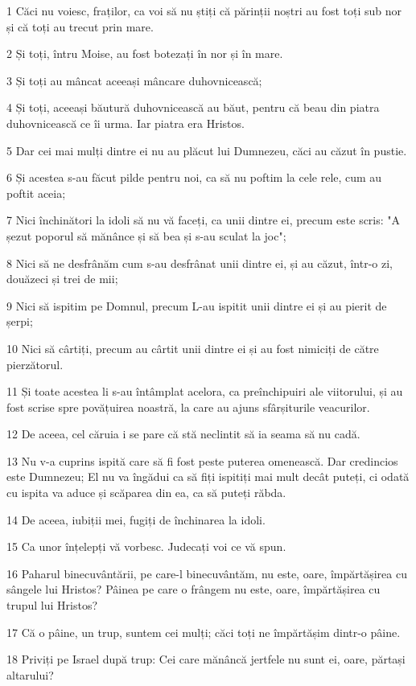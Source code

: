 \par 1 Căci nu voiesc, fraților, ca voi să nu știți că părinții noștri au fost toți sub nor și că toți au trecut prin mare.
\par 2 Și toți, întru Moise, au fost botezați în nor și în mare.
\par 3 Și toți au mâncat aceeași mâncare duhovnicească;
\par 4 Și toți, aceeași băutură duhovnicească au băut, pentru că beau din piatra duhovnicească ce îi urma. Iar piatra era Hristos.
\par 5 Dar cei mai mulți dintre ei nu au plăcut lui Dumnezeu, căci au căzut în pustie.
\par 6 Și acestea s-au făcut pilde pentru noi, ca să nu poftim la cele rele, cum au poftit aceia;
\par 7 Nici închinători la idoli să nu vă faceți, ca unii dintre ei, precum este scris: "A șezut poporul să mănânce și să bea și s-au sculat la joc";
\par 8 Nici să ne desfrânăm cum s-au desfrânat unii dintre ei, și au căzut, într-o zi, douăzeci și trei de mii;
\par 9 Nici să ispitim pe Domnul, precum L-au ispitit unii dintre ei și au pierit de șerpi;
\par 10 Nici să cârtiți, precum au cârtit unii dintre ei și au fost nimiciți de către pierzătorul.
\par 11 Și toate acestea li s-au întâmplat acelora, ca preînchipuiri ale viitorului, și au fost scrise spre povățuirea noastră, la care au ajuns sfârșiturile veacurilor.
\par 12 De aceea, cel căruia i se pare că stă neclintit să ia seama să nu cadă.
\par 13 Nu v-a cuprins ispită care să fi fost peste puterea omenească. Dar credincios este Dumnezeu; El nu va îngădui ca să fiți ispitiți mai mult decât puteți, ci odată cu ispita va aduce și scăparea din ea, ca să puteți răbda.
\par 14 De aceea, iubiții mei, fugiți de închinarea la idoli.
\par 15 Ca unor înțelepți vă vorbesc. Judecați voi ce vă spun.
\par 16 Paharul binecuvântării, pe care-l binecuvântăm, nu este, oare, împărtășirea cu sângele lui Hristos? Pâinea pe care o frângem nu este, oare, împărtășirea cu trupul lui Hristos?
\par 17 Că o pâine, un trup, suntem cei mulți; căci toți ne împărtășim dintr-o pâine.
\par 18 Priviți pe Israel după trup: Cei care mănâncă jertfele nu sunt ei, oare, părtași altarului?
